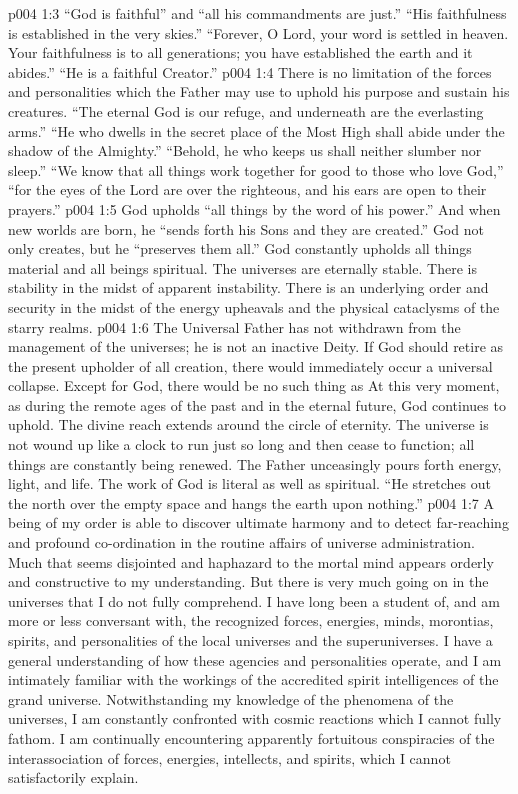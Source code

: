 \vs p004 1:3 “God is faithful” and “all his commandments are just.” “His faithfulness is established in the very skies.” “Forever, O Lord, your word is settled in heaven. Your faithfulness is to all generations; you have established the earth and it abides.” “He is a faithful Creator.”
\vs p004 1:4 There is no limitation of the forces and personalities which the Father may use to uphold his purpose and sustain his creatures. “The eternal God is our refuge, and underneath are the everlasting arms.” “He who dwells in the secret place of the Most High shall abide under the shadow of the Almighty.” “Behold, he who keeps us shall neither slumber nor sleep.” “We know that all things work together for good to those who love God,” “for the eyes of the Lord are over the righteous, and his ears are open to their prayers.”
\vs p004 1:5 God upholds “all things by the word of his power.” And when new worlds are born, he “sends forth his Sons and they are created.” God not only creates, but he “preserves them all.” God constantly upholds all things material and all beings spiritual. The universes are eternally stable. There is stability in the midst of apparent instability. There is an underlying order and security in the midst of the energy upheavals and the physical cataclysms of the starry realms.
\vs p004 1:6 The Universal Father has not withdrawn from the management of the universes; he is not an inactive Deity. If God should retire as the present upholder of all creation, there would immediately occur a universal collapse. Except for God, there would be no such thing as  At this very moment, as during the remote ages of the past and in the eternal future, God continues to uphold. The divine reach extends around the circle of eternity. The universe is not wound up like a clock to run just so long and then cease to function; all things are constantly being renewed. The Father unceasingly pours forth energy, light, and life. The work of God is literal as well as spiritual. “He stretches out the north over the empty space and hangs the earth upon nothing.”
\pc \vs p004 1:7 A being of my order is able to discover ultimate harmony and to detect far\hyp{}reaching and profound co\hyp{}ordination in the routine affairs of universe administration. Much that seems disjointed and haphazard to the mortal mind appears orderly and constructive to my understanding. But there is very much going on in the universes that I do not fully comprehend. I have long been a student of, and am more or less conversant with, the recognized forces, energies, minds, morontias, spirits, and personalities of the local universes and the superuniverses. I have a general understanding of how these agencies and personalities operate, and I am intimately familiar with the workings of the accredited spirit intelligences of the grand universe. Notwithstanding my knowledge of the phenomena of the universes, I am constantly confronted with cosmic reactions which I cannot fully fathom. I am continually encountering apparently fortuitous conspiracies of the interassociation of forces, energies, intellects, and spirits, which I cannot satisfactorily explain.
